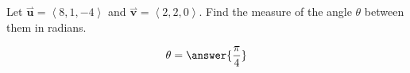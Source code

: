 \documentclass{ximera}
\author{Gregory Hartman \and Matthew Carr}
\begin{document}
\begin{exercise}
Let $\overset{\boldsymbol{\rightharpoonup}}{\mathbf{u}} = \left< 8,1,-4 \right>$ and $\overset{\boldsymbol{\rightharpoonup}}{\mathbf{v}} = \left< 2,2,0 \right>$. Find the
measure of the angle $\theta$ between them in radians.
\begin{prompt}
\[
\theta=\answer{\frac{\pi}{4}}
\]
\end{prompt}

\end{exercise}
\end{document}
